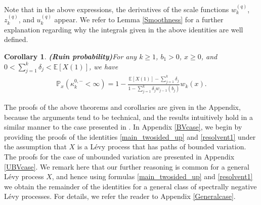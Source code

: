 \documentclass[12pt,reqno]{amsart}
\newtheorem{corol}[theorem]{Corollary}
\theoremstyle{definition}
\theoremstyle{remark}
\begin{document}
	Note that in the above expressions, the derivatives of the scale functions $w^{(q)}_k$, $z^{(q)}_k$, and $u^{(q)}_k$ appear.
	We refer to Lemma \ref{Smoothness} for a further explanation regarding why the integrals given in the above identities are well defined.
	


\begin{corol}{\textbf{(Ruin probability)}}\label{ruin_probab}
For any $k\ge 1$, $b_1 > 0$, $x\geq0$, and $0<\sum_{j=1}^k\delta_j<\mathbb{E}[X(1)]$, we have
\begin{align}\label{rp2}
\mathbb{P}_x\left(\kappa_k^{0,-}<\infty\right)=1-\frac{\mathbb{E}[X(1)]-\sum_{j=1}^k\delta_j}{1-\sum_{j=1}^{k} \delta_j w_{j-1}(b_j)}w_k(x).
\end{align}
\end{corol}

The proofs of the above theorems and corollaries  are given in the Appendix, because the arguments tend to be technical, and the results intuitively 
hold in a similar manner to the case presented in \cite{kyprianouloeffen2010}. 
In Appendix \ref{BVcase}, we begin by providing the proofs of the identities \eqref{main_twosided_up} and \eqref{resolvent1} under the assumption
that $X$ is a L\'evy process that has paths of bounded variation. 
The proofs for the case of unbounded variation are presented in Appendix \ref{UBVcase}.
We remark here that our further reasoning is common for a general L\'evy process $X$, and hence
using formulas \eqref{main_twosided_up} and \eqref{resolvent1} we obtain the remainder of the identities for a general class of spectrally negative L\'evy processes.
For details, we refer the reader to Appendix \ref{Generalcase}. 
\end{document}
